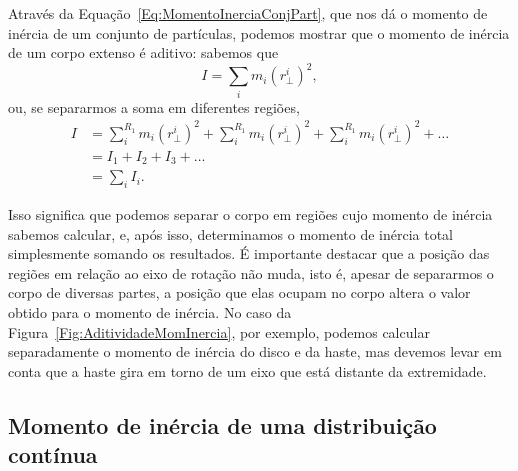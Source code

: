Através da Equação~\ref{Eq:MomentoInerciaConjPart}, que nos dá o momento de inércia de um conjunto de partículas, podemos mostrar que o momento de inércia de um corpo extenso é aditivo: sabemos que
\begin{equation}
    I = \sum_i m_i (r_\perp^i)^2,
\end{equation}
%
ou, se separarmos a soma em diferentes regiões,
\begin{align}
    I &= \sum_{i}^{R_1} m_i (r_\perp^i)^2 + \sum_{i}^{R_1} m_i (r_\perp^i)^2 + \sum_{i}^{R_1} m_i (r_\perp^i)^2 + \dots \\
    &= I_1 + I_2 + I_3 + \dots \\
    &= \sum_i I_i.
\end{align}

Isso significa que podemos separar o corpo em regiões cujo momento de inércia sabemos calcular, e, após isso, determinamos o momento de inércia total simplesmente somando os resultados. É importante destacar que a posição das regiões em relação ao eixo de rotação não muda, isto é, apesar de separarmos o corpo de diversas partes, a posição que elas ocupam no corpo altera o valor obtido para o momento de inércia. No caso da Figura~\ref{Fig:AditividadeMomInercia}, por exemplo, podemos calcular separadamente o momento de inércia do disco e da haste, mas devemos levar em conta que a haste gira em torno de um eixo que está distante da extremidade.

\subsection{Momento de inércia de uma distribuição contínua}

